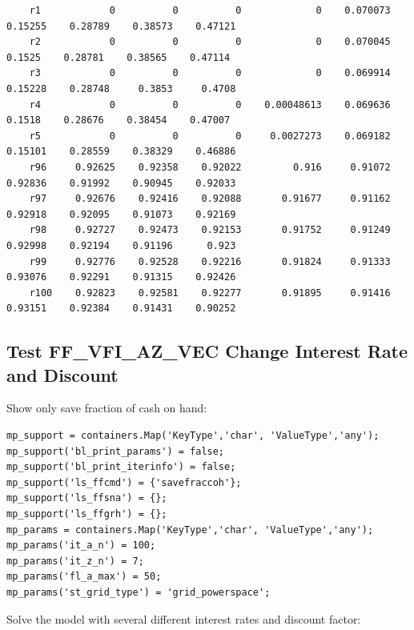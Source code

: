 \documentclass[
]{book}
\begin{document}
\begin{verbatim}
    r1            0          0          0             0    0.070073    0.15255    0.28789    0.38573    0.47121
    r2            0          0          0             0    0.070045     0.1525    0.28781    0.38565    0.47114
    r3            0          0          0             0    0.069914    0.15228    0.28748     0.3853     0.4708
    r4            0          0          0    0.00048613    0.069636     0.1518    0.28676    0.38454    0.47007
    r5            0          0          0     0.0027273    0.069182    0.15101    0.28559    0.38329    0.46886
    r96     0.92625    0.92358    0.92022         0.916     0.91072    0.92836    0.91992    0.90945    0.92033
    r97     0.92676    0.92416    0.92088       0.91677     0.91162    0.92918    0.92095    0.91073    0.92169
    r98     0.92727    0.92473    0.92153       0.91752     0.91249    0.92998    0.92194    0.91196      0.923
    r99     0.92776    0.92528    0.92216       0.91824     0.91333    0.93076    0.92291    0.91315    0.92426
    r100    0.92823    0.92581    0.92277       0.91895     0.91416    0.93151    0.92384    0.91431    0.90252
\end{verbatim}

\hypertarget{test-ff_vfi_az_vec-change-interest-rate-and-discount}{%
\subsection{Test FF\_VFI\_AZ\_VEC Change Interest Rate and Discount}\label{test-ff_vfi_az_vec-change-interest-rate-and-discount}}

Show only save fraction of cash on hand:

\begin{verbatim}
mp_support = containers.Map('KeyType','char', 'ValueType','any');
mp_support('bl_print_params') = false;
mp_support('bl_print_iterinfo') = false;
mp_support('ls_ffcmd') = {'savefraccoh'};
mp_support('ls_ffsna') = {};
mp_support('ls_ffgrh') = {};
mp_params = containers.Map('KeyType','char', 'ValueType','any');
mp_params('it_a_n') = 100;
mp_params('it_z_n') = 7;
mp_params('fl_a_max') = 50;
mp_params('st_grid_type') = 'grid_powerspace';
\end{verbatim}

Solve the model with several different interest rates and discount
factor:
\end{document}
